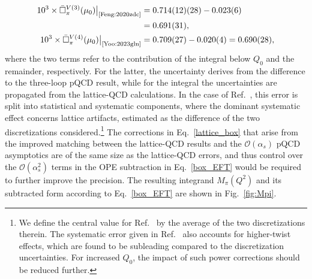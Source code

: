 \documentclass[prl,twocolumn,twoside,preprintnumbers,superscriptaddress,nofootinbib,letterpaper]{revtex4-1}
\newcommand{\Order}{\mathcal{O}}
\begin{document}
\begin{align}
\label{lattice_box}
10^3\times\bar\Box^{V(3)}_\pi(\mu_0)\big|_\text{\cite{Feng:2020zdc}}&=
0.714(12)(28)-0.023(6)\\
&=0.691(31),\notag\\
10^3\times\bar\Box^{V(4)}_\pi(\mu_0)\big|_\text{\cite{Yoo:2023gln}}&=0.709(27)-0.020(4)=0.690(28),\notag
\end{align}
where the two terms refer to the contribution of the integral below $Q_0$ and the remainder, respectively. For the latter, the uncertainty derives from the difference to the three-loop pQCD result, while for the integral the uncertainties are propagated from the lattice-QCD calculations.
In the case of Ref.~\cite{Feng:2020zdc}, this error is split into statistical and systematic components, where the dominant systematic effect concerns lattice artifacts, estimated as the difference of the two discretizations considered.\footnote{We define the central value for Ref.~\cite{Feng:2020zdc} by the average of the two discretizations therein. The systematic error given in Ref.~\cite{Feng:2020zdc} also accounts for higher-twist effects, which are found to be subleading compared to the discretization uncertainties. For increased $Q_0$, the impact of such power corrections should be reduced further.} The corrections in Eq.~\eqref{lattice_box} that arise from the improved matching between the lattice-QCD results and the $\Order(\alpha_s)$ pQCD asymptotics are of the same size as the lattice-QCD errors, and thus control over the $\Order(\alpha_s^2)$ terms in the OPE subtraction in Eq.~\eqref{box_EFT} would be required to further improve the precision. The resulting integrand $M_\pi(Q^2)$ and its subtracted form according to Eq.~\eqref{box_EFT}  are shown in Fig.~\ref{fig:Mpi}.
\end{document}
